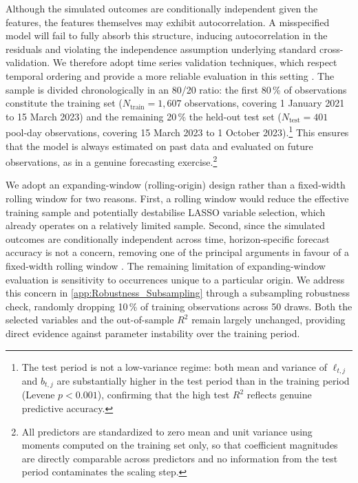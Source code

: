 \documentclass[a4paper,UKenglish,cleveref, autoref, thm-restate]{informs3}
\newcommand{\rev}[1]{{\color{purple}#1}}
\begin{document}
Although the simulated outcomes are conditionally independent given the features, the features themselves may exhibit autocorrelation. A misspecified model will fail to fully absorb this structure, inducing autocorrelation in the residuals and violating the independence assumption underlying standard cross-validation. We therefore adopt time series validation techniques, which respect temporal ordering and provide a more reliable evaluation in this setting \citep{BERGMEIR2012192}. The sample is divided chronologically in an 80/20 ratio: the first 80\,\% of observations constitute the training set ($N_{\text{train}} = 1{,}607$ observations, covering 1 January 2021 to 15 March 2023) and the remaining 20\,\% the held-out test set ($N_{\text{test}} = 401$ \rev{pool-day} observations, covering 15 March 2023 to 1 October 2023).\footnote{The 
test period is not a low-variance regime: both mean and 
variance of $\ell_{t,j}$ and $b_{t,j}$ are substantially 
higher in the test period than in the training period 
(Levene $p < 0.001$), confirming that the high test $R^2$ 
reflects genuine predictive accuracy.} This ensures that the model is always estimated on past data and evaluated on future observations, as in a genuine forecasting exercise.\footnote{All predictors are standardized to zero mean and unit variance using moments computed on the training set only, so that coefficient magnitudes are directly comparable across predictors and no information from the test period contaminates the scaling step.} 

We adopt an expanding-window (rolling-origin) design rather than a fixed-width rolling window for two reasons. First, a rolling window would reduce the effective training sample and potentially destabilise LASSO variable selection, which already operates on a relatively limited sample. Second, since the simulated outcomes are 
conditionally independent across time, horizon-specific forecast accuracy is not a concern, removing one of the principal arguments in favour of a fixed-width rolling window \citep{TASHMAN2000437}. The remaining limitation of expanding-window evaluation is sensitivity to occurrences unique to a particular origin. We address this concern in \ref{app:Robustness_Subsampling} through a subsampling robustness check, randomly dropping 10\,\% of training observations across 50 draws. Both the selected variables and the out-of-sample $R^2$ remain largely unchanged, providing direct evidence against parameter instability over the training period.

\medskip
\end{document}
